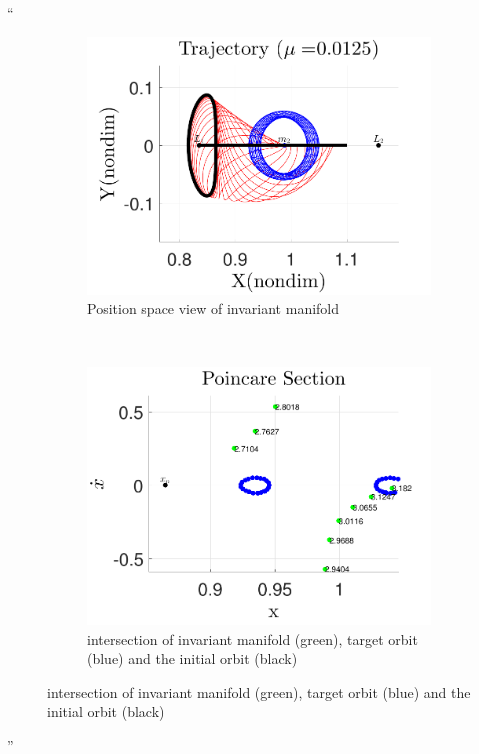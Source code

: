 \documentclass[11pt]{article}
\newenvironment{correction}{\begin{list}{}{\setlength{\leftmargin}{1cm}\setlength{\rightmargin}{1cm}}\vspace{\parsep}\item[]``}{''\end{list}}
\begin{document}
\begin{enumerate}
\begin{correction}
\begin{figure}[H]
        \centering 
        \begin{subfigure}[htbp]{0.5\textwidth} 
                \includegraphics[width=\textwidth]{manifold_trajectory} 
                \caption{Position space view of invariant manifold} \label{fig:manifold_trajectory} 
        \end{subfigure}~ %
        \begin{subfigure}[htbp]{0.5\textwidth} 
                \includegraphics[width=\textwidth]{manifold_poincare} 
                \caption{\Poincare intersection of invariant manifold (green), target orbit (blue) and the initial orbit (black)} \label{fig:manifold_poincare} 
        \end{subfigure} 

\end{figure}
\end{correction}
\end{enumerate}
\end{document}

